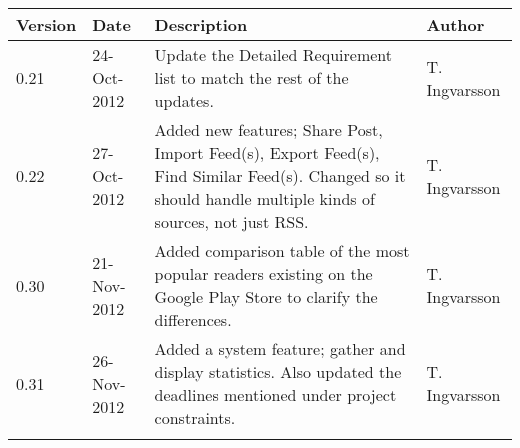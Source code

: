 \begin{center}
    \begin{tabularx}{\linewidth}{ | l | l | X | l |}
    \hline
    \textbf{Version} & \textbf{Date} & \textbf{Description} & \textbf{Author}\\ \hline
    0.21 & 24-Oct-2012 & Update the Detailed Requirement list to match the rest of the updates. & T. Ingvarsson\\ \hline
    0.22 & 27-Oct-2012 & Added new features; Share Post, Import Feed(s), Export Feed(s), Find Similar Feed(s). Changed so it should handle multiple kinds of sources, not just RSS. & T. Ingvarsson\\ \hline
    0.30 & 21-Nov-2012 & Added comparison table of the most popular readers existing on the Google Play Store to clarify the differences. & T. Ingvarsson\\ \hline
    0.31 & 26-Nov-2012 & Added a system feature; gather and display statistics. Also updated the deadlines mentioned under project constraints. & T. Ingvarsson\\ \hline
     &  &  & \\ \hline
    \end{tabularx}
\end{center}